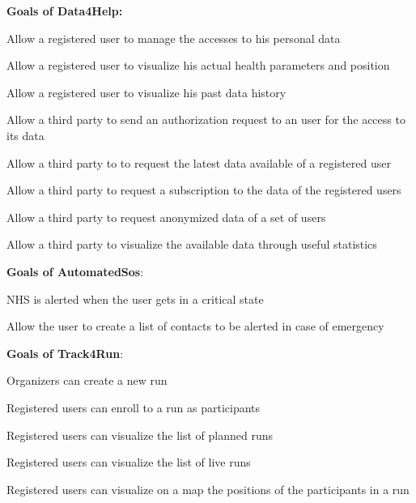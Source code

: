 \textbf{Goals of Data4Help:}
\begin{goalList}
\begin{enumerate}[label={[}G 1.\arabic*{]}]


    \item \label{goal:user1}Allow a registered user to manage the accesses to his personal data
    \item \label{goal:user2}Allow a registered user to visualize his actual health parameters and position
    \item \label{goal:user3}Allow a registered user to visualize his past data history

     \item \label{goal:parties1}Allow a third party to send an authorization request to an user for the access to its data
     \item \label{goal:parties2}Allow a third party to to request the latest data available of a registered user

    \item \label{goal:parties3}Allow a third party to request a subscription to the data of the registered users

    \item \label{goal:parties4}Allow a third party to request anonymized data of a set of users

    \item \label{goal:parties5}Allow a third party to visualize the available data through useful statistics


\end{enumerate}
\textbf{Goals of AutomatedSos}:
\begin{enumerate}[label={[}G 2.\arabic*{]}]

\item \label{goal:sos1}NHS is alerted when the user gets in a critical state
\item \label{goal:sos2}Allow the user to create a list of contacts to be alerted  in case of emergency

\end{enumerate}
\newpage

\textbf{Goals of Track4Run}:

\begin{enumerate}[label={[}G 3.\arabic*{]}]

\item \label{goal:run1}
Organizers can create a new run
\item \label{goal:run2}Registered users can enroll to a run as participants
\item \label{goal:run3}Registered users can visualize the list of planned runs

\item\label{goal:run5}Registered users can visualize the list of live runs


\item \label{goal:run4}Registered users can visualize on a map the positions of the participants
in a run


\end{enumerate}
\end{goalList}
